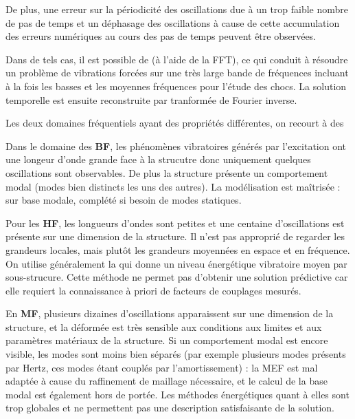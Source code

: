 \medskip
{} 
De plus, une erreur sur la périodicité des oscillations due à un trop faible nombre de pas de temps et 
un déphasage des oscillations à cause de cette accumulation des erreurs numériques au cours des pas 
de temps peuvent être observées.

Dans de tels cas, il est possible de  
(à l'aide de la FFT),  ce qui conduit à résoudre un problème de vibrations forcées sur une très large bande 
de fréquences incluant à la fois les basses et les moyennes fréquences pour l'étude des chocs.
La solution temporelle est ensuite reconstruite par tranformée de Fourier 
inverse.

Les deux domaines fréquentiels ayant des propriétés différentes, on recourt à des 

\medskip
Dans le domaine des \textbf{BF}, les phénomènes vibratoires générés par l'excitation ont une longeur
d'onde grande face à la strucutre donc uniquement quelques oscillations sont observables. De plus
la structure présente un comportement modal (modes bien distincts les uns des autres).
La modélisation est maîtrisée :  sur base modale, complété si besoin de modes
statiques.

\medskip
Pour les \textbf{HF}, les longueurs d'ondes sont petites et une centaine d'oscillations est présente sur une 
dimension de la structure. Il n'est pas approprié de regarder les grandeurs locales, mais plutôt les 
grandeurs moyennées en espace et en fréquence. On utilise généralement la  
qui donne un niveau énergétique vibratoire moyen par sous-strucure. Cette méthode ne permet 
pas d'obtenir une solution prédictive car elle requiert la connaissance à priori de facteurs de 
couplages mesurés.

\medskip
En \textbf{MF}, plusieurs dizaines d'oscillations apparaissent sur une dimension de la structure, et la
déformée est très sensible aux conditions aux limites et aux paramètres matériaux
de la structure. Si un comportement modal est encore visible, les modes sont moins bien
séparés (par exemple plusieurs modes présents par Hertz, ces modes étant couplés
par l'amortissement) : la MEF est mal adaptée à cause du raffinement de maillage
nécessaire, et le calcul de la base modal est également hors de portée. Les méthodes
énergétiques quant à elles sont trop globales et ne permettent pas une description satisfaisante
de la solution.

